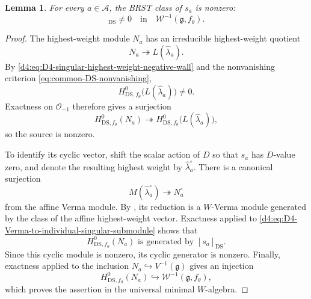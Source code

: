 \documentclass[11pt,reqno]{amsart}
\newtheorem{lemma}[theorem]{Lemma}
\theoremstyle{definition}
\theoremstyle{remark}
\begin{document}
\begin{lemma}
\label{d4:lem:D4-reduced-singular-vectors-nonzero}
For every \(a\in\mathcal A\), the BRST class of \(s_a\) is nonzero:
\begin{equation*}
  [s_a]_{\mathrm{DS}}\ne0
  \quad\text{in}\quad
  \mathcal W^{-1}(\mathfrak g,f_\theta).
\end{equation*}
\end{lemma}

\begin{proof}
The highest-weight module \(N_a\) has an irreducible highest-weight
quotient
\begin{equation*}
  N_a\twoheadrightarrow L(\widehat\lambda_a).
\end{equation*}
By \eqref{d4:eq:D4-singular-highest-weight-negative-wall} and the
nonvanishing criterion \eqref{eq:common-DS-nonvanishing},
\begin{equation*}
  H^0_{\mathrm{DS},f_\theta}
  \bigl(L(\widehat\lambda_a)\bigr)\ne0.
\end{equation*}
Exactness on \(\mathcal O_{-1}\) therefore gives a surjection
\begin{equation*}
  H^0_{\mathrm{DS},f_\theta}(N_a)
  \twoheadrightarrow
  H^0_{\mathrm{DS},f_\theta}
  \bigl(L(\widehat\lambda_a)\bigr),
\end{equation*}
so the source is nonzero.

To identify its cyclic vector, shift the scalar action of \(D\) so that
\(s_a\) has \(D\)-value zero, and denote the resulting highest weight by
\(\widehat\lambda_a^\circ\).  There is a canonical surjection
\begin{equation}
  M(\widehat\lambda_a^\circ)\twoheadrightarrow N_a^\circ
  \label{d4:eq:D4-Verma-to-individual-singular-submodule}
\end{equation}
from the affine Verma module.  By
\cite[Theorem~6.3]{KacWakimoto2004}, its reduction is a \(W\)-Verma
module generated by the class of the affine highest-weight vector.
Exactness applied to
\eqref{d4:eq:D4-Verma-to-individual-singular-submodule} shows that
\begin{equation}
  H^0_{\mathrm{DS},f_\theta}(N_a)
  \text{ is generated by }[s_a]_{\mathrm{DS}}.
  \label{d4:eq:D4-individual-reduction-cyclic}
\end{equation}
Since this cyclic module is nonzero, its cyclic generator is nonzero.
Finally, exactness applied to the inclusion
\(N_a\hookrightarrow V^{-1}(\mathfrak g)\) gives an injection
\begin{equation*}
  H^0_{\mathrm{DS},f_\theta}(N_a)
  \hookrightarrow
  \mathcal W^{-1}(\mathfrak g,f_\theta),
\end{equation*}
which proves the assertion in the universal minimal \(W\)-algebra.
\end{proof}
\end{document}
